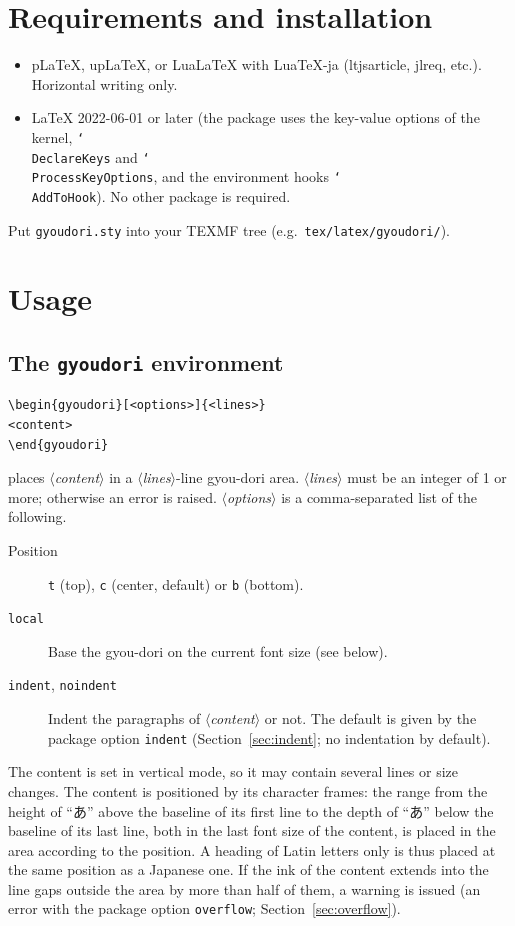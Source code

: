 \documentclass[paper=a4,dvipdfmx]{jlreq}
\newcommand\pkg[1]{\textsf{#1}}
\newcommand\opt[1]{\texttt{#1}}
\newcommand\env[1]{\texttt{#1}}
\newcommand\cs[1]{\texttt{\char`\\#1}}
\newcommand\meta[1]{$\langle$\textit{#1}$\rangle$}
\begin{document}
\section{Requirements and installation}

\begin{itemize}
\item pLaTeX, upLaTeX, or LuaLaTeX with LuaTeX-ja (\pkg{ltjsarticle},
  \pkg{jlreq}, etc.). Horizontal writing only.
\item \LaTeX{} 2022-06-01 or later (the package uses the key-value options of
  the kernel, \cs{DeclareKeys} and \cs{ProcessKeyOptions}, and the environment
  hooks \cs{AddToHook}). No other package is required.
\end{itemize}

Put \texttt{gyoudori.sty} into your TEXMF tree (e.g.\ \texttt{tex/latex/gyoudori/}).

\section{Usage}

\subsection{The \env{gyoudori} environment}\label{sec:env}

\begin{verbatim}
\begin{gyoudori}[<options>]{<lines>}
<content>
\end{gyoudori}
\end{verbatim}
places \meta{content} in a \meta{lines}-line gyou-dori area. \meta{lines} must be
an integer of 1 or more; otherwise an error is raised. \meta{options} is a
comma-separated list of the following.
\begin{description}
\item[Position] \opt{t} (top), \opt{c} (center, default) or \opt{b} (bottom).
\item[\opt{local}] Base the gyou-dori on the current font size (see below).
\item[\opt{indent}, \opt{noindent}] Indent the paragraphs of \meta{content} or
  not. The default is given by the package option \opt{indent}
  (Section~\ref{sec:indent}; no indentation by default).
\end{description}
The content is set in vertical mode, so it may contain several lines or size
changes. The content is positioned by its character frames: the range from the
height of ``あ'' above the baseline of its first line to the depth of ``あ'' below
the baseline of its last line, both in the last font size of the content, is
placed in the area according to the position. A heading of Latin letters only is
thus placed at the same position as a Japanese one. If the ink of the content
extends into the line gaps outside the area by more than half of them, a warning
is issued (an error with the package option \opt{overflow};
Section~\ref{sec:overflow}).
\end{document}
